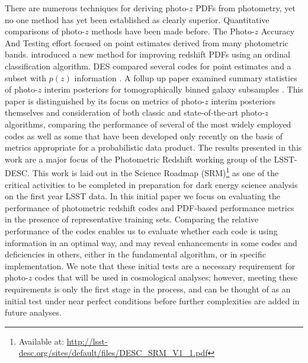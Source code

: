 There are numerous techniques for deriving photo-$z$ PDFs from photometry, yet no one method has yet been established as clearly superior.
Quantitative comparisons of photo-$z$ methods have been made before.
The Photo-$z$ Accuracy And Testing \citep[PHAT,][]{Hildebrandt:10} effort focused on point estimates derived from many photometric bands.  \citet{Rau:2015} introduced a new method for improving redshift PDFs using an ordinal classification algorithm.
DES compared several codes for point estimates and a subset with $p(z)$ information \citep{Sanchez:14}.  A follup up paper examined summary statistics of photo-$z$ interim posteriors for tomographically binned galaxy subsamples \citep{Bonnett:16}.  
This paper is distinguished by its focus on metrics of photo-$z$ interim posteriors themselves and consideration of both classic and state-of-the-art photo-$z$ algorithms, comparing the performance of several of the most widely employed codes as well as some that have been developed only recently on the basis of metrics appropriate for a probabilistic data product.
The results presented in this work are
a major focus of the Photometric Redshift working group of the LSST-DESC.
This work is laid out in the Science Roadmap (SRM)\footnote{Available at: \url{http://lsst-desc.org/sites/default/files/DESC_SRM_V1_1.pdf}} as one of the critical activities to be completed in preparation for dark energy science analysis on the first year LSST data.
In this initial paper we focus on evaluating the performance of photometric redshift codes and PDF-based performance metrics in the presence of representative training sets.
Comparing the relative performance of the codes enables us to evaluate whether each code is using information in an optimal way, and may reveal enhancements in some codes and deficiencies in others, either in the fundamental algorithm, or in specific implementation.  We note that these initial tests are a necessary requirement for photo-$z$ codes that will be used in cosmological analyses; however, meeting these requirements is only the first stage in the process, and can be thought of as an initial test under near perfect conditions before further complexities are added in future analyses.

